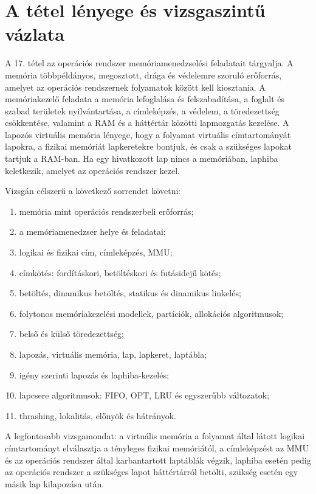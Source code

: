 \section{A tétel lényege és vizsgaszintű vázlata}

\begin{summarybox}
A 17. tétel az operációs rendszer memóriamenedzselési feladatait tárgyalja. A memória többpéldányos, megosztott, drága és védelemre szoruló erőforrás, amelyet az operációs rendszernek folyamatok között kell kiosztania. A memóriakezelő feladata a memória lefoglalása és felszabadítása, a foglalt és szabad területek nyilvántartása, a címleképzés, a védelem, a töredezettség csökkentése, valamint a RAM és a háttértár közötti lapmozgatás kezelése. A lapozós virtuális memória lényege, hogy a folyamat virtuális címtartományát lapokra, a fizikai memóriát lapkeretekre bontjuk, és csak a szükséges lapokat tartjuk a RAM-ban. Ha egy hivatkozott lap nincs a memóriában, laphiba keletkezik, amelyet az operációs rendszer kezel.
\end{summarybox}

Vizsgán célszerű a következő sorrendet követni:

\begin{enumerate}
  \item memória mint operációs rendszerbeli erőforrás;
  \item a memóriamenedzser helye és feladatai;
  \item logikai és fizikai cím, címleképzés, MMU;
  \item címkötés: fordításkori, betöltéskori és futásidejű kötés;
  \item betöltés, dinamikus betöltés, statikus és dinamikus linkelés;
  \item folytonos memóriakezelési modellek, partíciók, allokációs algoritmusok;
  \item belső és külső töredezettség;
  \item lapozás, virtuális memória, lap, lapkeret, laptábla;
  \item igény szerinti lapozás és laphiba-kezelés;
  \item lapcsere algoritmusok: FIFO, OPT, LRU és egyszerűbb változatok;
  \item thrashing, lokalitás, előnyök és hátrányok.
\end{enumerate}

A legfontosabb vizsgamondat: a virtuális memória a folyamat által látott logikai címtartományt elválasztja a tényleges fizikai memóriától, a címleképzést az MMU és az operációs rendszer által karbantartott laptáblák végzik, laphiba esetén pedig az operációs rendszer a szükséges lapot háttértárról betölti, szükség esetén egy másik lap kilapozása után.

